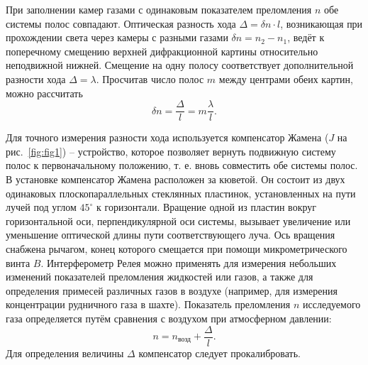 \documentclass[12pt]{article}
\begin{document}
    При заполнении камер газами с одинаковым показателем преломления $n$ обе системы полос совпадают.
    Оптическая разность хода $\Delta = \delta n \cdot l$, возникающая при прохождении света
    через камеры с разными газами $\delta n = n_2 - n_1$, ведёт к поперечному смещению
    верхней дифракционной картины относительно неподвижной нижней.
    Смещение на одну полосу соответствует дополнительной разности хода $\Delta = \lambda$.
    Просчитав число полос $m$ между центрами обеих картин, можно рассчитать
    \begin{equation}
        \delta n = \frac{\Delta}{l} = m \frac{\lambda}{l}.
        \label{eq:eq2}
    \end{equation}

    Для точного измерения разности хода используется компенсатор Жамена ($J$ на рис.\ \ref{fig:fig1}) -- устройство,
    которое позволяет вернуть подвижную систему полос к первоначальному положению,
    т. е. вновь совместить обе системы полос.
    В установке компенсатор Жамена расположен за кюветой.
    Он состоит из двух одинаковых плоскопараллельных стеклянных пластинок,
    установленных на пути лучей под углом $45^{\circ}$ к горизонтали.
    Вращение одной из пластин вокруг горизонтальной оси, перпендикулярной оси системы,
    вызывает увеличение или уменьшение оптической длины пути соответствующего луча.
    Ось вращения снабжена рычагом, конец которого смещается при помощи микрометрического винта $B$.
    Интерферометр Релея можно применять для измерения небольших изменений показателей преломления жидкостей или газов,
    а также для определения примесей различных газов в воздухе
    (например, для измерения концентрации рудничного газа в шахте).
    Показатель преломления $n$ исследуемого газа определяется путём сравнения с воздухом при атмосферном давлении:
    \begin{equation}
        n = n_{\text{возд}} + \frac{\Delta}{l}.
        \label{eq:eq3}
    \end{equation}
    Для определения величины $\Delta$ компенсатор следует прокалибровать.
\end{document}
